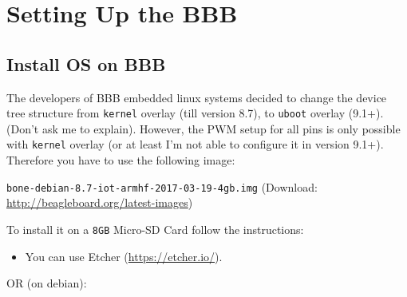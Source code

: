 \documentclass[
	fontsize=10pt
	paper=a4
]{scrartcl}
\begin{document}
\clearpage
\section{Setting Up the BBB}




\subsection{Install OS on BBB}

The developers of BBB embedded linux systems decided to change the device tree structure from \texttt{kernel} overlay (till version 8.7), to \texttt{uboot} overlay (9.1+). (Don't ask me to explain).
However, the PWM setup for all pins is only possible with \texttt{kernel} overlay (or at least I'm not able to configure it in version 9.1+).
Therefore you have to use the following image:

\texttt{bone-debian-8.7-iot-armhf-2017-03-19-4gb.img}
(Download: \url{http://beagleboard.org/latest-images})

To install it on a \texttt{8GB} Micro-SD Card follow the instructions:

\begin{itemize}
\item You can use Etcher (\url{https://etcher.io/}).
\end{itemize}

OR (on debian):
\end{document}
